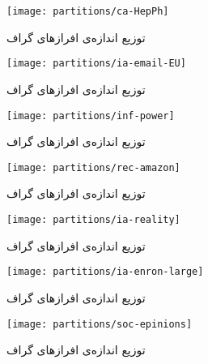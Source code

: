 \begin{figure}[!ht]
  \centering
  \texttt{[image: partitions/ca-HepPh]}
  \caption{توزیع اندازه‌ی افراز‌های گراف
  }
\end{figure}

\begin{figure}[!ht]
  \centering
  \texttt{[image: partitions/ia-email-EU]}
  \caption{توزیع اندازه‌ی افراز‌های گراف
  }
\end{figure}

\clearpage
\begin{figure}[!ht]
  \centering
  \texttt{[image: partitions/inf-power]}
  \caption{توزیع اندازه‌ی افراز‌های گراف
  }
\end{figure}

\begin{figure}[!ht]
  \centering
  \texttt{[image: partitions/rec-amazon]}
  \caption{توزیع اندازه‌ی افراز‌های گراف
  }
\end{figure}

\begin{figure}[!ht]
  \centering
  \texttt{[image: partitions/ia-reality]}
  \caption{توزیع اندازه‌ی افراز‌های گراف
  }
\end{figure}

\clearpage
\begin{figure}[!ht]
  \centering
  \texttt{[image: partitions/ia-enron-large]}
  \caption{توزیع اندازه‌ی افراز‌های گراف
  }
\end{figure}

\begin{figure}[!ht]
  \centering
  \texttt{[image: partitions/soc-epinions]}
  \caption{توزیع اندازه‌ی افراز‌های گراف
  }
\end{figure}